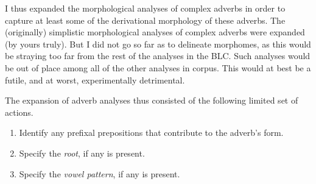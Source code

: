 


%

I thus expanded the morphological analyses of complex adverbs in order to capture at 
least some of the derivational morphology of these adverbs. %
The (originally) simplistic morphological analyses of complex adverbs were expanded 
(by yours truly). 
But I did not go so far as to delineate morphomes, as this would 
be straying too far from the rest of the analyses in the \ac{BLC}. Such 
analyses would be out of place among all of the other analyses in corpus. 
This would at best be a futile, and at worst, experimentally detrimental.

The expansion of adverb analyses thus consisted of the following limited set of actions. 
\begin{enumerate}
\item Identify any prefixal prepositions that contribute to the adverb's form.
\item Specify the \emph{root}, if any is present.
\item Specify the \emph{vowel pattern}, if any is present.
\end{enumerate}

